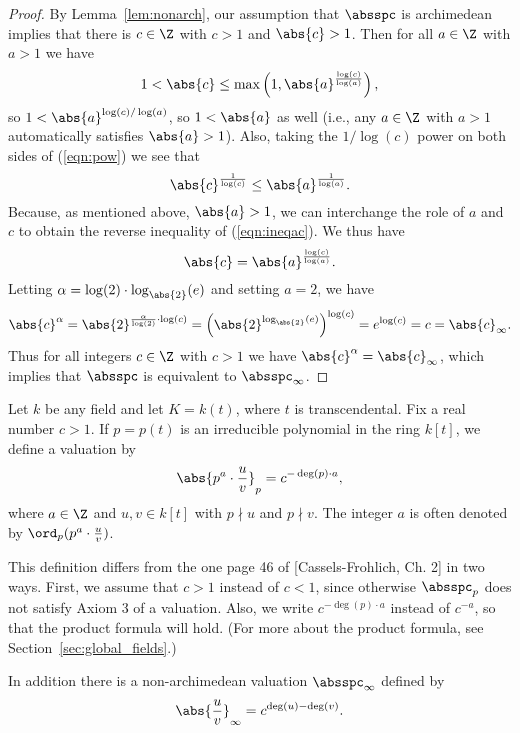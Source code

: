 \documentclass[11pt]{book}
\begin{document}
\begin{ch}
\begin{proof}
By Lemma~\ref{lem:nonarch}, our assumption that $\absspc$ is archimedean implies
that there is $c\in\Z$ with $c>1$ and $\abs{c}>1$.
Then for all $a\in\Z$ with $a>1$ we have
\begin{equation}\label{eqn:pow}
  1 < \abs{c} \leq
  \max\left(1,\abs{a}^{\frac{\log(c)}{\log(a)}}\right),
\end{equation}
so $1<\abs{a}^{\log(c)/\log(a)}$, so
$1<\abs{a}$ as well (i.e., any $a\in\Z$ with
$a>1$ automatically satisfies $\abs{a}>1$).  Also, taking the
$1/\log(c)$ power on both sides of (\ref{eqn:pow})
we see that
\begin{equation}\label{eqn:ineqac}
  \abs{c}^{\frac{1}{\log(c)}}
    \leq   \abs{a}^{\frac{1}{\log(a)}}.
\end{equation}
Because, as mentioned above, $\abs{a}>1$, we can interchange the role
of $a$ and $c$ to obtain the reverse inequality of (\ref{eqn:ineqac}).
We thus have
$$
  \abs{c}
    =   \abs{a}^{\frac{\log(c)}{\log(a)}}.
$$ Letting $\alpha=\log(2)\cdot \log_{\abs{2}}(e)$ and setting $a=2$,
we have
$$
  \abs{c}^{\alpha} = \abs{2}^{\frac{\alpha}{\log(2)}\cdot \log(c)}
      = \left(\abs{2}^{\log_{\abs{2}}(e)}\right)^{\log(c)} =
   e^{\log(c)} = c = \abs{c}_\infty.
$$
Thus for all integers $c\in\Z$ with $c>1$ we have
$\abs{c}^{\alpha} = \abs{c}_{\infty}$, which implies
that $\absspc$ is equivalent to $\absspc_\infty$.
\end{proof}

Let $k$ be any field and let $K=k(t)$, where $t$
is transcendental.  Fix a real number $c>1$.
If $p=p(t)$ is an irreducible
polynomial in the ring $k[t]$, we define a valuation
by
\begin{equation}\label{eqn:ffabsp}
  \abs{p^a \cdot \frac{u}{v}}_p = c^{-\deg(p)\cdot a},
\end{equation}
where $a\in\Z$ and $u,v\in k[t]$ with
$p\nmid u$ and $p\nmid v$. The integer $a$ is often denoted
by $\ord_p(p^a \cdot \frac{u}{v})$.
\begin{remark}
This definition differs from the one page 46 of [Cassels-Frohlich,
Ch. 2] in two ways.   First, we assume that $c>1$ instead
of $c<1$, since otherwise $\absspc_p$ does not satisfy
Axiom 3 of a valuation.  Also, we write $c^{-\deg(p)\cdot a}$
instead of $c^{-a}$, so that the product formula will
hold.  (For more about the product formula, see
Section~\ref{sec:global_fields}.)
\end{remark}
In addition there is a non-archimedean valuation
$\absspc_\infty$ defined by
\begin{equation}\label{eqn:ffabsoo}
  \abs{\frac{u}{v}}_\infty = c^{\deg(u)-\deg(v)}.
\end{equation}



\end{ch}
\end{document}
